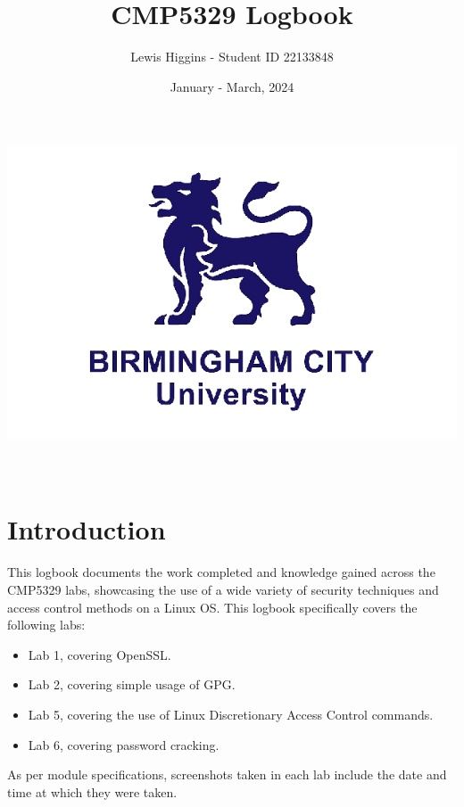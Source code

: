 \documentclass[12pt]{report}
\title{CMP5329 Logbook}
\author{Lewis Higgins - Student ID 22133848}
\date{January - March, 2024}
\begin{document}
    \makeatletter
    \begin{titlepage}
        \begin{center}
            \includegraphics[width=0.7\linewidth]{bcu logo}\\[4ex]
            {\huge \bfseries  \@title }\\[2ex]
            {\@author}\\[50ex]
            {\large \@date}
        \end{center}
    \end{titlepage}
    \makeatother
    \thispagestyle{empty}
    \newpage

    \tableofcontents

    \chapter*{Introduction}\label{ch:introduction}

    This logbook documents the work completed and knowledge gained across the CMP5329 labs, showcasing
    the use of a wide variety of security techniques and access control methods on a Linux OS\@.
    This logbook specifically covers the following labs:
    \begin{itemize}
        \item Lab 1, covering OpenSSL\@.
        \item Lab 2, covering simple usage of GPG\@.
        \item Lab 5, covering the use of Linux Discretionary Access Control commands.
        \item Lab 6, covering password cracking.
    \end{itemize}

    As per module specifications, screenshots taken in each lab
    include the date and time at which they were taken.\\
\end{document}
